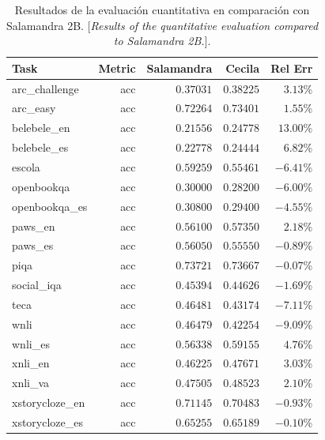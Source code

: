 \documentclass[10pt,twoside]{rcmart} %
\begin{document}
\begin{table}[hbt]
\caption{Resultados de la evaluación cuantitativa en comparación con Salamandra 2B. [\textit{Results of the quantitative evaluation compared to Salamandra 2B.}].}
\begin{center}
\begin{tabular}{lrrrr}\hline\hline
Task                & Metric        & Salamandra  & Cecila     & Rel Err     		 \\\hline\hline
arc\_challenge      & acc           & $0.37031$   & $0.38225$  & $3.13$\%    		 \\
arc\_easy           & acc           & $0.72264$   & $0.73401$  & $1.55$\%    		 \\
belebele\_en        & acc           & $0.21556$   & $0.24778$  & $13.00$\%   		 \\
belebele\_es        & acc           & $0.22778$   & $0.24444$  & $6.82$\%    		 \\
escola              & acc           & $0.59259$   & $0.55461$  & $-6.41$\%   		 \\
openbookqa          & acc           & $0.30000$   & $0.28200$  & $-6.00$\%   		 \\
openbookqa\_es      & acc           & $0.30800$   & $0.29400$  & $-4.55$\%   		 \\
paws\_en            & acc           & $0.56100$   & $0.57350$  & $2.18$\%    		 \\
paws\_es            & acc           & $0.56050$   & $0.55550$  & $-0.89$\%   		 \\
piqa                & acc           & $0.73721$   & $0.73667$  & $-0.07$\%   		 \\
social\_iqa         & acc           & $0.45394$   & $0.44626$  & $-1.69$\%   		 \\
teca                & acc           & $0.46481$   & $0.43174$  & $-7.11$\%   		 \\
wnli                & acc           & $0.46479$   & $0.42254$  & $-9.09$\%   		 \\
wnli\_es            & acc           & $0.56338$   & $0.59155$  & $4.76$\%    		 \\
xnli\_en            & acc           & $0.46225$   & $0.47671$  & $3.03$\%    		 \\
xnli\_va            & acc           & $0.47505$   & $0.48523$  & $2.10$\%    		 \\
xstorycloze\_en     & acc           & $0.71145$   & $0.70483$  & $-0.93$\%   		 \\
xstorycloze\_es     & acc           & $0.65255$   & $0.65189$  & $-0.10$\%   		 \\

\end{tabular}
\end{center}
\end{table}
\end{document}
